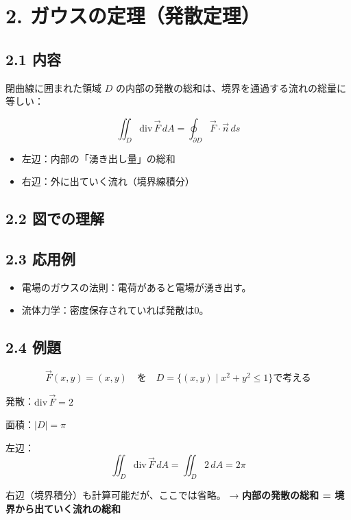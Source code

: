 \documentclass[a4,11pt]{article}
\begin{document}
\section*{2. ガウスの定理（発散定理）}

\subsection*{2.1 内容}
閉曲線に囲まれた領域 $D$ の内部の発散の総和は、境界を通過する流れの総量に等しい：

\[
\iint_D \mathrm{div} \, \vec{F} \, dA = \oint_{\partial D} \vec{F} \cdot \vec{n} \, ds
\]

\begin{itemize}
  \item 左辺：内部の「湧き出し量」の総和
  \item 右辺：外に出ていく流れ（境界線積分）
\end{itemize}

\subsection*{2.2 図での理解}

\begin{center}
\end{center}

\subsection*{2.3 応用例}
\begin{itemize}
  \item 電場のガウスの法則：電荷があると電場が湧き出す。
  \item 流体力学：密度保存されていれば発散は0。
\end{itemize}

\subsection*{2.4 例題}
\[
\vec{F}(x, y) = (x, y) \quad \text{を} \quad D = \{(x, y) \mid x^2 + y^2 \leq 1\} \text{で考える}
\]

発散：$\mathrm{div} \, \vec{F} = 2$

面積：$|D| = \pi$

左辺：
\[
\iint_D \mathrm{div} \, \vec{F} \, dA = \iint_D 2 \, dA = 2 \pi
\]

右辺（境界積分）も計算可能だが、ここでは省略。  
→ \textbf{内部の発散の総和 = 境界から出ていく流れの総和}
\end{document}
